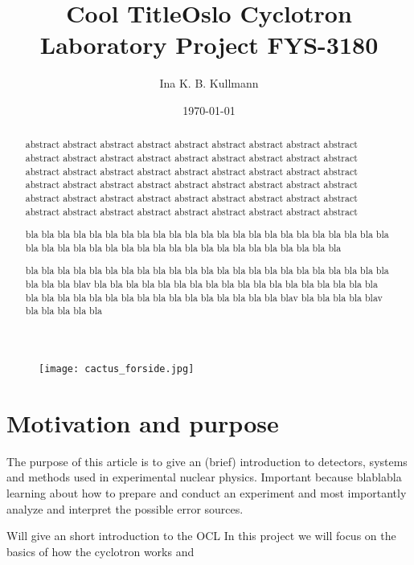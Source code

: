 \documentclass[11pt,a4wide]{article}
\title{{\Huge {\bf Cool Title}}\linebreak \linebreak Oslo Cyclotron Laboratory \linebreak \small{Project FYS-3180}}
\author{Ina K. B. Kullmann}
\date{\today}
\begin{document}
\maketitle

\begin{figure}[htp]
\centering
\texttt{[image: cactus\_forside.jpg]}
\label{fig:front_page}
\end{figure}

\newpage

\tableofcontents
\newpage

\begin{abstract}
abstract abstract abstract abstract abstract abstract abstract abstract abstract abstract abstract abstract abstract abstract abstract abstract abstract abstract abstract abstract abstract abstract abstract abstract abstract abstract abstract abstract abstract abstract abstract abstract abstract abstract abstract abstract abstract abstract abstract abstract abstract abstract abstract abstract abstract abstract abstract abstract abstract abstract abstract abstract abstract abstract 

bla bla bla bla bla bla bla bla bla bla bla bla bla bla bla bla bla bla bla bla bla bla bla bla bla bla bla bla bla bla bla bla bla bla bla bla bla bla bla bla bla bla bla 

bla bla bla bla bla bla bla bla bla bla bla bla bla bla bla bla bla bla bla bla bla bla bla bla bla bla blav bla bla bla bla bla bla bla bla bla bla bla bla bla bla bla bla bla bla bla bla bla bla bla bla bla bla bla bla bla bla bla bla bla bla blav bla bla bla bla blav bla bla bla bla bla
\end{abstract}


\section{Motivation and purpose}
The purpose of this article is to give an (brief) introduction to detectors, systems and methods used in experimental nuclear physics. Important because blablabla learning about how to prepare and conduct an experiment and most importantly analyze and interpret the possible error sources.

Will give an short introduction to the OCL
In this project we will focus on the basics of how the cyclotron works and 
\end{document}
